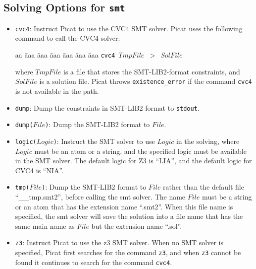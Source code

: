 \subsection{Solving Options for \texttt{smt}}
\begin{itemize}
\item \texttt{cvc4}: Instruct Picat to use the CVC4 SMT solver. Picat uses the following command to call the CVC4 solver:
\begin{tabbing}
aa \= aaa \= aaa \= aaa \= aaa \= aaa \= aaa \kill
\> \texttt{cvc4 $TmpFile$ $>$ $SolFile$ }
\end{tabbing}
where $TmpFile$ is a file that stores the SMT-LIB2-format constraints, and $SolFile$ is a solution file. Picat throws \texttt{existence\_error} if the command \texttt{cvc4} is not available in the path.
\item \texttt{dump}: Dump the constraints in SMT-LIB2 format to \texttt{stdout}.
\item \texttt{dump($File$)}: Dump the SMT-LIB2 format to $File$.
\item \texttt{logic($Logic$)}: Instruct the SMT solver to use $Logic$ in the solving, where $Logic$ must be an atom or a string, and the specified logic must be available in the SMT solver. The default logic for Z3 is ``LIA'', and the default logic for CVC4 is ``NIA''.
\item \texttt{tmp($File$)}: Dump the SMT-LIB2 format to $File$ rather than the default file ``\_\_tmp.smt2'', before calling the smt solver. The name $File$  must be a string or an atom that has the extension name ``.smt2''. When this file name is specified, the smt solver will save the solution into a file name that has the same main name as $File$ but the extension name ``.sol''.
\item \texttt{z3}: Instruct Picat to use the z3 SMT solver. When no SMT solver is specified, Picat first searches for the command \texttt{z3}, and when \texttt{z3} cannot be found it continues to search for the command \texttt{cvc4}.
\end{itemize}
\ignore{

}
